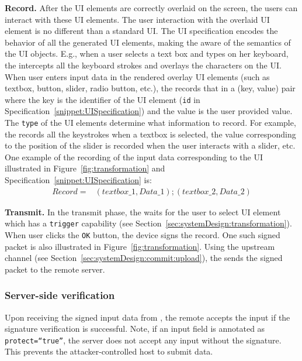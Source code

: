 \begin{mylist}
\item \textbf{Record.} After the UI elements are correctly overlaid on the screen, the users can interact with these UI elements. The user interaction with the overlaid UI element is no different than a standard UI. The UI specification encodes the behavior of all the generated UI elements, making the \device aware of the semantics of the UI objects. E.g., when a user selects a text box and types on her keyboard, the \device intercepts all the keyboard strokes and overlays the characters on the UI.
When user enters input data in the rendered overlay UI elements (such as textbox, button, slider, radio button, etc.), the \device records that in a (key, value) pair where the key is the identifier of the UI element (\texttt{id} in Specification~\ref{snippet:UISpecification}) and the value is the user provided value. The \texttt{type} of the UI elements determine what information to record. For example, the \device records all the keystrokes when a textbox is selected, the value corresponding to the position of the slider is recorded when the user interacts with a slider, etc. One example of the recording of the input data corresponding to the UI illustrated in Figure~\ref{fig:transformation} and Specification~\ref{snippet:UISpecification} is: 
\begin{align*}
Record = & (textbox\_1, Data\_1);(textbox\_2,Data\_2)
\end{align*}

\item \textbf{Transmit.} In the transmit phase, the \device waits for the user to select UI element which has a \texttt{trigger} capability (see Section~\ref{sec:systemDesign:transformation}).  When user clicks the \texttt{OK} button, the device signs the record. One such signed packet is also illustrated in Figure~\ref{fig:transformation}. Using the upstream channel (see Section~\ref{sec:systemDesign:commit:upload}), the \device sends the signed packet to the remote server.
\end{mylist} 

\subsubsection{\bfseries Server-side verification} \label{sec:systemDesign:commit:verification}Upon receiving the signed input data from \device, the remote accepts the input if the signature verification is successful. Note, if an input field is annotated as \texttt{protect=``true''}, the server does not accept any input without the \device signature. This prevents the attacker-controlled host to submit data. 

